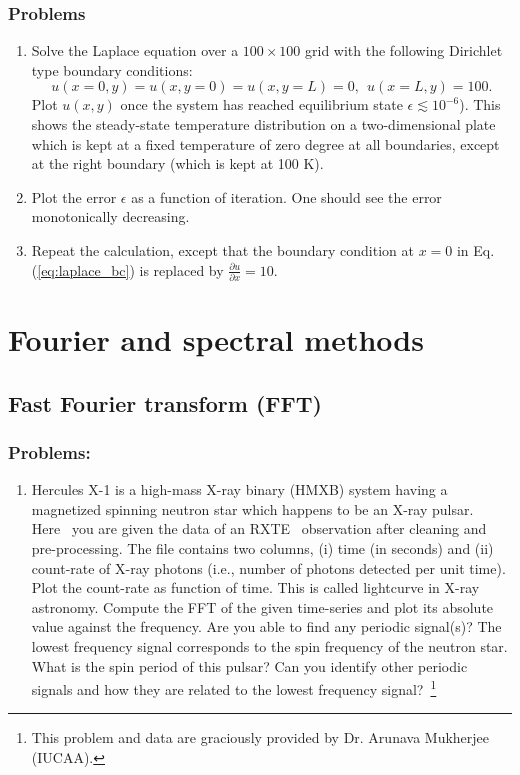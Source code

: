 \subsubsection{Problems}

\begin{enumerate}
\item Solve the Laplace equation over a $100 \times 100$ grid  with the following Dirichlet type boundary conditions:
\begin{equation}
u(x = 0, y) = u(x, y=0) = u(x, y=L) = 0, ~~ u(x = L, y) = 100.  
\label{eq:laplace_bc}
\end{equation}
Plot $u(x,y)$ once the system has reached equilibrium state $\epsilon \lesssim 10^{-6}$). This shows the steady-state temperature distribution on a two-dimensional plate which is kept at a fixed temperature of zero degree at all boundaries, except at the right boundary (which is kept at 100 K). 
\item Plot the error $\epsilon$ as a function of iteration. One should see the error monotonically decreasing. 
\item Repeat the calculation, except that the boundary condition at $x = 0$ in Eq.\,(\ref{eq:laplace_bc}) is replaced by $\frac{\partial u}{\partial x} = 10$.
\end{enumerate}

\section{Fourier and spectral methods}
\subsection{Fast Fourier transform (FFT)}
\subsubsection{Problems:}
\begin{enumerate}
\item Hercules X-1 is a high-mass X-ray binary (HMXB) system having a magnetized spinning neutron star which happens to be an X-ray pulsar. Here~\cite{rxte-data} you are given the data of an RXTE~\cite{rxte} observation after cleaning and pre-processing. The file contains two columns, (i) time (in seconds) and (ii) count-rate of X-ray photons (i.e., number of photons detected per unit time). Plot the count-rate as function of time. This is called lightcurve in X-ray astronomy. Compute the FFT of the given time-series and plot its absolute value against the frequency. Are you able to find any periodic signal(s)? The lowest frequency signal corresponds to the spin frequency of the neutron star.  What is the spin period of this pulsar? Can you identify other periodic signals and how they are related to the lowest frequency signal?~\footnote{This problem and data are graciously provided by Dr. Arunava Mukherjee (IUCAA).}
\end{enumerate}

